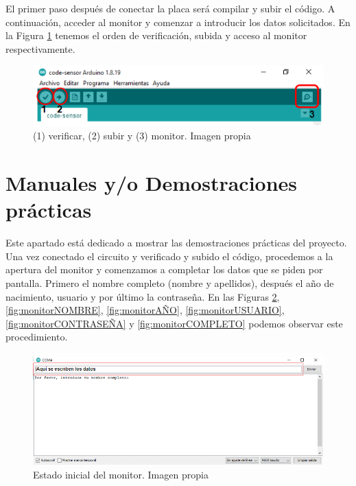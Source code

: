 El primer paso después de conectar la placa será compilar y subir el código. A continuación, acceder al monitor y comenzar a introducir los datos solicitados. En la Figura \ref{fig:verificar} tenemos el orden de verificación, subida y acceso al monitor respectivamente.
\begin{figure}[h]
    \centering
    \includegraphics[width=1\textwidth]{img/compilar.PNG}
    \caption{(1) verificar, (2) subir y (3) monitor. Imagen propia }
    \label{fig:verificar}
\end{figure}


\section{Manuales y/o Demostraciones prácticas}
 Este apartado está dedicado a mostrar las demostraciones prácticas del proyecto. Una vez conectado el circuito y verificado y subido el código, procedemos a la apertura del monitor y comenzamos a completar los datos que se piden por pantalla. Primero el nombre completo (nombre y apellidos), después el año de nacimiento, usuario y por último la contraseña. En las Figuras \ref{fig:monitorINICIAL}, \ref{fig:monitorNOMBRE}, \ref{fig:monitorAÑO}, \ref{fig:monitorUSUARIO}, \ref{fig:monitorCONTRASEÑA} y \ref{fig:monitorCOMPLETO}  podemos observar este procedimiento.
 \begin{figure}[H]
    \centering
    \includegraphics[width=1.3\textwidth]{img/monitorvacio.PNG}
    \caption{Estado inicial del monitor. Imagen propia }
    \label{fig:monitorINICIAL}
\end{figure}

